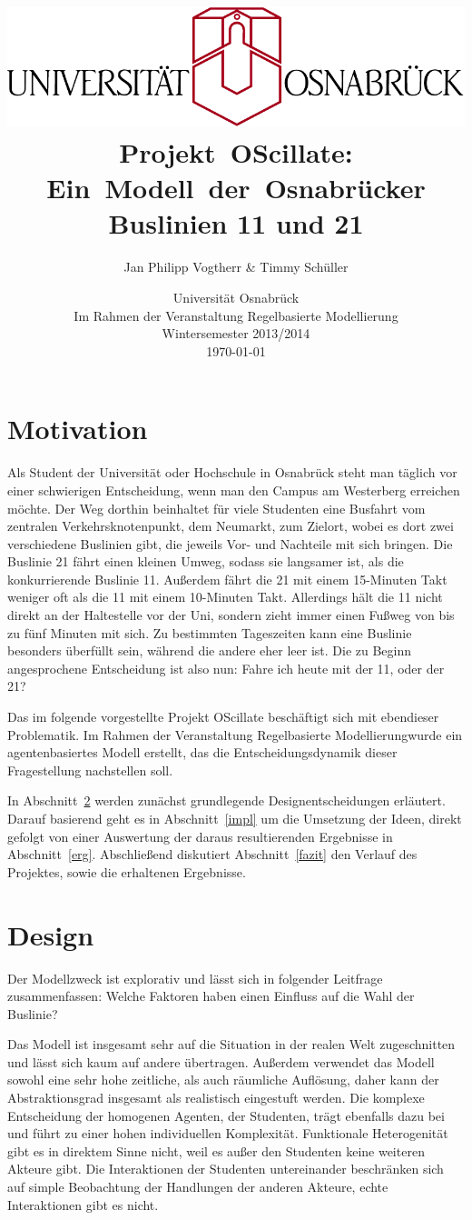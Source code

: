 \documentclass[12pt,a4paper]{scrartcl}
\author{Jan Philipp Vogtherr \& Timmy Schüller\vspace{0.5cm}}
\title{\includegraphics[scale=0.8]{unilogo.pdf}\vspace*{1cm}
\mbox{Projekt OScillate:} \mbox{Ein Modell der Osnabrücker} Buslinien 11 und 21\vspace{0.3cm}}
\date{Universität Osnabrück \\
Im Rahmen der Veranstaltung \glqq Regelbasierte Modellierung\grqq \\
\vspace*{0.4cm}
Wintersemester 2013/2014 \\
\today}
\begin{document}
\maketitle
\thispagestyle{empty}
\newpage
\tableofcontents
\newpage

\section{Motivation}
Als Student der Universität oder Hochschule in Osnabrück steht man täglich vor einer schwierigen Entscheidung, wenn man den Campus am Westerberg erreichen möchte. Der Weg dorthin beinhaltet für viele Studenten eine Busfahrt vom zentralen Verkehrsknotenpunkt, dem Neumarkt, zum Zielort, wobei es dort zwei verschiedene Buslinien gibt, die jeweils Vor- und Nachteile mit sich bringen. Die Buslinie 21 fährt einen kleinen Umweg, sodass sie langsamer ist, als die konkurrierende Buslinie 11. Außerdem fährt die 21 mit einem 15-Minuten Takt weniger oft als die 11 mit einem 10-Minuten Takt. Allerdings hält die 11 nicht direkt an der Haltestelle vor der Uni, sondern zieht immer einen Fußweg von bis zu fünf Minuten mit sich. Zu bestimmten Tageszeiten kann eine Buslinie besonders überfüllt sein, während die andere eher leer ist. Die zu Beginn angesprochene Entscheidung ist also nun: \glqq Fahre ich heute mit der 11, oder der 21?\grqq

Das im folgende vorgestellte Projekt OScillate beschäftigt sich mit ebendieser Problematik. Im Rahmen der Veranstaltung \glqq Regelbasierte Modellierung\grqq wurde ein agentenbasiertes Modell erstellt, das die Entscheidungsdynamik dieser Fragestellung nachstellen soll.

In Abschnitt~\ref{design} werden zunächst grundlegende Designentscheidungen erläutert. Darauf basierend geht es in Abschnitt~\ref{impl} um die Umsetzung der Ideen, direkt gefolgt von einer Auswertung der daraus resultierenden Ergebnisse in Abschnitt~\ref{erg}. Abschließend diskutiert Abschnitt~\ref{fazit} den Verlauf des Projektes, sowie die erhaltenen Ergebnisse.

\section{Design}\label{design}
Der Modellzweck ist explorativ und lässt sich in folgender Leitfrage zusammenfassen: \glqq Welche Faktoren haben einen Einfluss auf die Wahl der Buslinie?\grqq 

Das Modell ist insgesamt sehr auf die Situation in der realen Welt zugeschnitten und lässt sich kaum auf andere übertragen. Außerdem verwendet das Modell sowohl eine sehr hohe zeitliche, als auch räumliche Auflösung, daher kann der Abstraktionsgrad insgesamt als realistisch eingestuft werden. Die komplexe Entscheidung der homogenen Agenten, der Studenten, trägt ebenfalls dazu bei und führt zu einer hohen individuellen Komplexität. Funktionale Heterogenität gibt es in direktem Sinne nicht, weil es außer den Studenten keine weiteren Akteure gibt. Die Interaktionen der Studenten untereinander beschränken sich auf simple Beobachtung der Handlungen der anderen Akteure, echte Interaktionen gibt es nicht.
\end{document}
